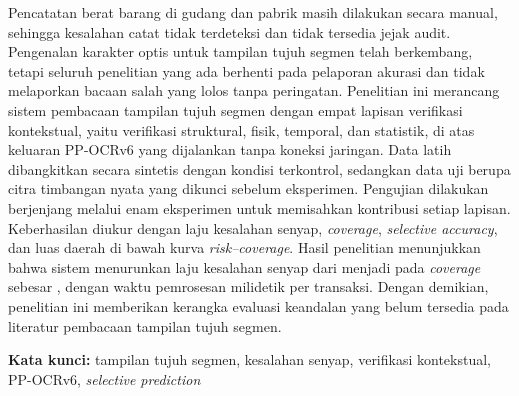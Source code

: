 
Pencatatan berat barang di gudang dan pabrik masih dilakukan secara manual,
sehingga kesalahan catat tidak terdeteksi dan tidak tersedia jejak audit.
Pengenalan karakter optis untuk tampilan tujuh segmen telah berkembang, tetapi
seluruh penelitian yang ada berhenti pada pelaporan akurasi dan tidak
melaporkan bacaan salah yang lolos tanpa peringatan. Penelitian ini merancang
sistem pembacaan tampilan tujuh segmen dengan empat lapisan verifikasi
kontekstual, yaitu verifikasi struktural, fisik, temporal, dan statistik, di
atas keluaran PP-OCRv6 yang dijalankan tanpa koneksi jaringan. Data latih
dibangkitkan secara sintetis dengan kondisi terkontrol, sedangkan data uji
berupa citra timbangan nyata yang dikunci sebelum eksperimen. Pengujian dilakukan
berjenjang melalui enam eksperimen untuk memisahkan kontribusi setiap lapisan.
Keberhasilan diukur dengan laju kesalahan senyap, \textit{coverage},
\textit{selective accuracy}, dan luas daerah di bawah kurva
\textit{risk--coverage}. Hasil penelitian menunjukkan bahwa sistem menurunkan
laju kesalahan senyap dari  menjadi  pada
\textit{coverage} sebesar , dengan waktu pemrosesan
 milidetik per transaksi. Dengan demikian, penelitian ini
memberikan kerangka evaluasi keandalan yang belum tersedia pada literatur
pembacaan tampilan tujuh segmen.

\vspace{1\baselineskip}
\noindent\textbf{Kata kunci:} tampilan tujuh segmen, kesalahan senyap, verifikasi
kontekstual, PP-OCRv6, \textit{selective prediction}
